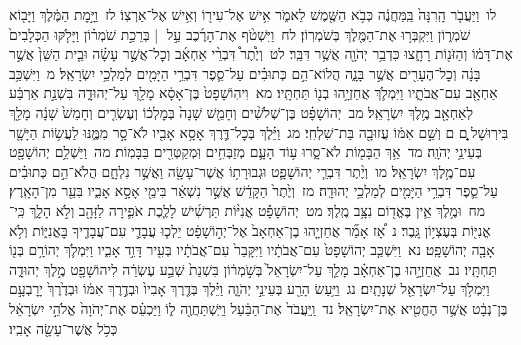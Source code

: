 \documentclass[18pt]{article}
\newcommand{\kri}[1]{\Afootnote{#1}}	%
\begin{document}
 {\loc לו~}וַיַּעֲבֹ֤ר הָֽרִנָּה֙ בַּֽמַּחֲנֶ֔ה כְּבֹ֥א הַשֶּׁ֖מֶשׁ לֵאמֹ֑ר אִ֥ישׁ אֶל־עִיר֖וֹ וְאִ֥ישׁ אֶל־אַרְצֽוֹ׃ \startlock
 {\loc לז~}וַיָּ֣מׇת הַמֶּ֔לֶךְ וַיָּב֖וֹא שֹׁמְר֑וֹן וַיִּקְבְּר֥וּ אֶת־הַמֶּ֖לֶךְ בְּשֹׁמְרֽוֹן׃ \startlock
 {\loc לח~}וַיִּשְׁטֹ֨ף אֶת־הָרֶ֜כֶב עַ֣ל  |  בְּרֵכַ֣ת שֹׁמְר֗וֹן וַיָּלֹ֤קּוּ הַכְּלָבִים֙ אֶת־דָּמ֔וֹ וְהַזֹּנ֖וֹת רָחָ֑צוּ כִּדְבַ֥ר יְהֹוָ֖ה אֲשֶׁ֥ר דִּבֵּֽר׃ \startlock
 {\loc לט~}וְיֶ֩תֶר֩ דִּבְרֵ֨י אַחְאָ֜ב וְכׇל־אֲשֶׁ֣ר עָשָׂ֗ה וּבֵ֤ית הַשֵּׁן֙ אֲשֶׁ֣ר בָּנָ֔ה וְכׇל־הֶעָרִ֖ים אֲשֶׁ֣ר בָּנָ֑ה הֲלוֹא־הֵ֣ם כְּתוּבִ֗ים עַל־סֵ֛פֶר דִּבְרֵ֥י הַיָּמִ֖ים לְמַלְכֵ֥י יִשְׂרָאֵֽל׃ \startlock
 {\loc מ~}וַיִּשְׁכַּ֥ב אַחְאָ֖ב עִם־אֲבֹתָ֑יו וַיִּמְלֹ֛ךְ אֲחַזְיָ֥הוּ בְנ֖וֹ תַּחְתָּֽיו׃ \startlock
 {\loc מא~}וִיהֽוֹשָׁפָט֙ בֶּן־אָסָ֔א מָלַ֖ךְ עַל־יְהוּדָ֑ה בִּשְׁנַ֣ת אַרְבַּ֔ע לְאַחְאָ֖ב מֶ֥לֶךְ יִשְׂרָאֵֽל׃ \startlock
 {\loc מב~}יְהוֹשָׁפָ֗ט בֶּן־שְׁלֹשִׁ֨ים וְחָמֵ֤שׁ שָׁנָה֙ בְּמׇלְכ֔וֹ וְעֶשְׂרִ֤ים וְחָמֵשׁ֙ שָׁנָ֔ה מָלַ֖ךְ בִּירֽוּשָׁל ָ֑͏ְם ם וְשֵׁ֣ם אִמּ֔וֹ עֲזוּבָ֖ה בַּת־שִׁלְחִֽי׃ \startlock
 {\loc מג~}וַיֵּ֗לֶךְ בְּכׇל־דֶּ֛רֶךְ אָסָ֥א אָבִ֖יו לֹא־סָ֣ר מִמֶּ֑נּוּ לַעֲשׂ֥וֹת הַיָּשָׁ֖ר בְּעֵינֵ֥י יְהֹוָֽה׃ \startlock
 {\loc מד~}אַ֥ךְ הַבָּמ֖וֹת לֹא־סָ֑רוּ ע֥וֹד הָעָ֛ם מְזַבְּחִ֥ים וּֽמְקַטְּרִ֖ים בַּבָּמֽוֹת׃ \startlock
 {\loc מה~}וַיַּשְׁלֵ֥ם יְהוֹשָׁפָ֖ט עִם־מֶ֥לֶךְ יִשְׂרָאֵֽל׃ \startlock
 {\loc מו~}וְיֶ֨תֶר דִּבְרֵ֧י יְהוֹשָׁפָ֛ט וּגְבוּרָת֥וֹ אֲשֶׁר־עָשָׂ֖ה וַאֲשֶׁ֣ר נִלְחָ֑ם הֲלֹא־הֵ֣ם כְּתוּבִ֗ים עַל־סֵ֛פֶר דִּבְרֵ֥י הַיָּמִ֖ים לְמַלְכֵ֥י יְהוּדָֽה׃ \startlock
 {\loc מז~}וְיֶ֙תֶר֙ הַקָּדֵ֔שׁ אֲשֶׁ֣ר נִשְׁאַ֔ר בִּימֵ֖י אָסָ֣א אָבִ֑יו בִּעֵ֖ר מִן־הָאָֽרֶץ׃ \startlock
 {\loc מח~}וּמֶ֥לֶךְ אֵ֛ין בֶּאֱד֖וֹם נִצָּ֥ב מֶֽלֶךְ׃ \startlock
 {\loc מט~}יְהוֹשָׁפָ֡ט  \edtext{(עשר)}{\kri{קרי: עָשָׂה֩}}  אֳנִיּ֨וֹת תַּרְשִׁ֜ישׁ לָלֶ֧כֶת אֹפִ֛ירָה לַזָּהָ֖ב וְלֹ֣א הָלָ֑ךְ כִּֽי־ \edtext{(נשברה)}{\kri{קרי: נִשְׁבְּר֥וּ}}  אֳנִיּ֖וֹת בְּעֶצְי֥וֹן גָּֽבֶר׃ \startlock
 {\loc נ~}אָ֠ז אָמַ֞ר אֲחַזְיָ֤הוּ בֶן־אַחְאָב֙ אֶל־יְה֣וֹשָׁפָ֔ט יֵלְכ֧וּ עֲבָדַ֛י עִם־עֲבָדֶ֖יךָ  בׇּאֳנִיּ֑וֹת  וְלֹ֥א אָבָ֖ה יְהוֹשָׁפָֽט׃ \startlock
 {\loc נא~}וַיִּשְׁכַּ֤ב יְהוֹשָׁפָט֙ עִם־אֲבֹתָ֔יו וַיִּקָּבֵר֙ עִם־אֲבֹתָ֔יו בְּעִ֖יר דָּוִ֣ד אָבִ֑יו וַיִּמְלֹ֛ךְ יְהוֹרָ֥ם בְּנ֖וֹ תַּחְתָּֽיו׃ \startlock
 {\loc נב~}אֲחַזְיָ֣הוּ בֶן־אַחְאָ֗ב מָלַ֤ךְ עַל־יִשְׂרָאֵל֙ בְּשֹׁ֣מְר֔וֹן בִּשְׁנַת֙ שְׁבַ֣ע עֶשְׂרֵ֔ה לִיהוֹשָׁפָ֖ט מֶ֣לֶךְ יְהוּדָ֑ה וַיִּמְלֹ֥ךְ עַל־יִשְׂרָאֵ֖ל שְׁנָתָֽיִם׃ \startlock
 {\loc נג~}וַיַּ֥עַשׂ הָרַ֖ע בְּעֵינֵ֣י יְהֹוָ֑ה וַיֵּ֗לֶךְ בְּדֶ֤רֶךְ אָבִיו֙ וּבְדֶ֣רֶךְ אִמּ֔וֹ וּבְדֶ֙רֶךְ֙ יָרׇבְעָ֣ם בֶּן־נְבָ֔ט אֲשֶׁ֥ר הֶחֱטִ֖יא אֶת־יִשְׂרָאֵֽל׃ \startlock
 {\loc נד~}וַֽיַּעֲבֹד֙ אֶת־הַבַּ֔עַל וַיִּֽשְׁתַּחֲוֶ֖ה ל֑וֹ וַיַּכְעֵ֗ס אֶת־יְהֹוָה֙ אֱלֹהֵ֣י יִשְׂרָאֵ֔ל כְּכֹ֥ל אֲשֶׁר־עָשָׂ֖ה אָבִֽיו׃ 
     \pend 
{}
\end{document}
